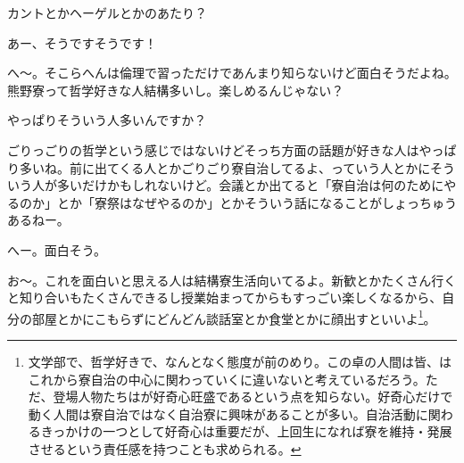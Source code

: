 \begin{multicols}{2}
カントとかヘーゲルとかのあたり？

あー、そうですそうです！

へ～。そこらへんは倫理で習っただけであんまり知らないけど面白そうだよね。熊野寮って哲学好きな人結構多いし。楽しめるんじゃない？

やっぱりそういう人多いんですか？

ごりっごりの哲学という感じではないけどそっち方面の話題が好きな人はやっぱり多いね。前に出てくる人とかごりごり寮自治してるよ、っていう人とかにそういう人が多いだけかもしれないけど。会議とか出てると「寮自治は何のためにやるのか」とか「寮祭はなぜやるのか」とかそういう話になることがしょっちゅうあるねー。

へー。面白そう。

お〜。これを面白いと思える人は結構寮生活向いてるよ。新歓とかたくさん行くと知り合いもたくさんできるし授業始まってからもすっごい楽しくなるから、自分の部屋とかにこもらずにどんどん談話室とか食堂とかに顔出すといいよ\footnote{文学部で、哲学好きで、なんとなく態度が前のめり。この卓の人間は皆、はこれから寮自治の中心に関わっていくに違いないと考えているだろう。ただ、登場人物たちはが好奇心旺盛であるという点を知らない。好奇心だけで動く人間は寮自治ではなく自治寮に興味があることが多い。自治活動に関わるきっかけの一つとして好奇心は重要だが、上回生になれば寮を維持・発展させるという責任感を持つことも求められる。}。
\par
\dotfill


\end{multicols}

